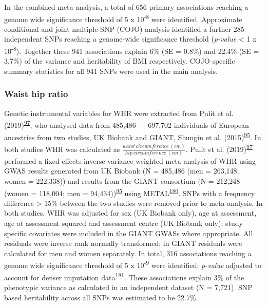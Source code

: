\documentclass[11pt,twoside]{bristolthesis}
\begin{document}
In the combined meta-analysis, a total of 656 primary associations reaching a genome wide significance threshold of 5 x 10\textsuperscript{-8} were identified. Approximate conditional and joint multiple-SNP (COJO) analysis identified a further 285 independent SNPs reaching a genome-wide significance threshold (\emph{p-value} \textless{} 1 x 10\textsuperscript{-8}). Together these 941 associations explain 6\% (SE = 0.8\%) and 22.4\% (SE = 3.7\%) of the variance and heritability of BMI respectively. COJO specific summary statistics for all 941 SNPs were used in the main analysis.

\hypertarget{waist-hip-ratio}{%
\subsubsection{Waist hip ratio}\label{waist-hip-ratio}}

Genetic instrumental variables for WHR were extracted from Pulit et al. (2019)\textsuperscript{\protect\hyperlink{ref-Pulit2019}{97}}, who analysed data from 485,486 --- 697,702 individuals of European ancestries from two studies, UK Biobank and GIANT, Shungin et al. (2015)\textsuperscript{\protect\hyperlink{ref-Shungin2015}{95}}. In both studies WHR was calculated as \(\displaystyle \frac{waist\ circumference\ (cm)} {hip\ circumference\ (cm)}\). Pulit et al. (2019)\textsuperscript{\protect\hyperlink{ref-Pulit2019}{97}} performed a fixed effects inverse variance weighted meta-analysis of WHR using GWAS results generated from UK Biobank (N = 485,486 (men = 263,148; women = 222,338)) and results from the GIANT consortium (N = 212,248 (women = 118,004; men = 94,434))\textsuperscript{\protect\hyperlink{ref-Shungin2015}{95}} using METAL\textsuperscript{\protect\hyperlink{ref-Willer2010a}{180}}. SNPs with a frequency difference \textgreater{} 15\% between the two studies were removed prior to meta-analysis. In both studies, WHR was adjusted for sex (UK Biobank only), age at assessment, age at assessment squared and assessment centre (UK Biobank only); study specific covariates were included in the GIANT GWASs where appropriate. All residuals were inverse rank normally transformed; in GIANT residuals were calculated for men and women separately. In total, 316 associations reaching a genome wide significance threshold of 5 x 10\textsuperscript{-9} were identified; \emph{p-value} adjusted to account for denser imputation data\textsuperscript{\protect\hyperlink{ref-Pulit2017a}{181}}. These associations explain 3\% of the phenotypic variance as calculated in an independent dataset (N = 7,721). SNP based heritability across all SNPs was estimated to be 22.7\%.
\end{document}
